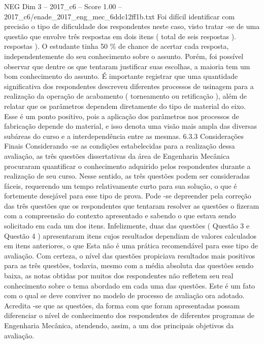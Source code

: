 \begin{textsample}{NEG Dim 3 – 2017\_c6 – Score 1.00 – 2017\_c6/enade\_2017\_eng\_mec\_6ddc12ff1b.txt}
Foi difícil identificar com precisão o tipo de dificuldade dos respondentes neste caso, visto tratar -se de uma questão que envolve três respostas em dois itens ( total de seis respostas ). respostas ).
O estudante tinha 50 \% de chance de acertar cada resposta, independentemente do seu conhecimento sobre o assunto.
Porém, foi possível observar que dentre os que tentaram justificar suas escolhas, a maioria tem um bom conhecimento do assunto.
É importante registrar que uma quantidade significativa dos respondentes descreveu diferentes processos de usinagem para a realização da operação de acabamento ( torneamento ou retificação ), além de relatar que os parâmetros dependem diretamente do tipo de material do eixo.
Esse é um ponto positivo, pois a aplicação dos parâmetros nos processos de fabricação depende do material, e isso denota uma visão mais ampla das diversas subáreas do curso e a interdependência entre as mesmas. 6.3.3 Considerações Finais Considerando -se as condições estabelecidas para a realização dessa avaliação, as três questões dissertativas da área de Engenharia Mecânica procuraram quantificar o conhecimento adquirido pelos respondentes durante a realização de seu curso.
Nesse sentido, as três questões podem ser consideradas fáceis, requerendo um tempo relativamente curto para sua solução, o que é fortemente desejável para esse tipo de prova.
Pode -se depreender pela correção das três questões que os respondentes que tentaram resolver as questões o fizeram com a compreensão do contexto apresentado e sabendo o que estava sendo solicitado em cada um dos itens.
Infelizmente, duas das questões ( Questão 3 e Questão 4 ) apresentaram itens cujos resultados dependiam de valores calculados em itens anteriores, o que Esta não é uma prática recomendável para esse tipo de avaliação.
Com certeza, o nível das questões propiciava resultados mais positivos para as três questões, todavia, mesmo com a média absoluta das questões sendo baixa, as notas obtidas por muitos dos respondentes não refletem seu real conhecimento sobre o tema abordado em cada uma das questões.
Este é um fato com o qual se deve conviver no modelo de processo de avaliação ora adotado.
Acredita -se que as questões, da forma com que foram apresentadas possam diferenciar o nível de conhecimento dos respondentes de diferentes programas de Engenharia Mecânica, atendendo, assim, a um dos principais objetivos da avaliação.

\end{textsample}
